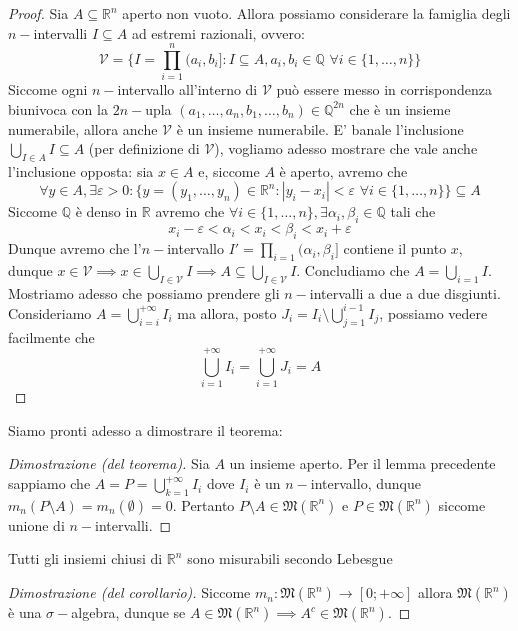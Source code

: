 \begin{proof}
	Sia $A \subseteq \mathbb{R}^n$ aperto non vuoto. Allora possiamo considerare la famiglia degli $n-$intervalli $I \subseteq A$ ad estremi razionali, ovvero:
	$$\mathcal{V} = \{I = \prod_{i=1}^n (a_i, b_i] : I \subseteq A, a_i, b_i \in \mathbb{Q} \, \, \forall i \in \{1, \ldots, n\} \}$$
	Siccome ogni $n-$intervallo all'interno di $\mathcal{V}$ può essere messo in corrispondenza biunivoca con la $2n-$upla $(a_1, \ldots, a_n, b_1, \ldots, b_n) \in \mathbb{Q}^{2n}$ che è un insieme numerabile, allora anche $\mathcal{V}$ è un insieme numerabile. E' banale l'inclusione $\bigcup\limits_{I \in A} I \subseteq A$ (per definizione di $\mathcal{V}$), vogliamo
	adesso mostrare che vale anche l'inclusione opposta: sia $x \in A$ e, siccome $A$ è aperto, avremo che 
	$$\forall y \in A, \exists \varepsilon > 0 : \{y = (y_1, \ldots, y_n) \in \mathbb{R}^n : |y_i - x_i| < \varepsilon \, \, \forall i \in \{1, \ldots, n \} \} \subseteq A$$
	Siccome $\mathbb{Q}$ è denso in $\mathbb{R}$ avremo che $\forall i \in \{1, \ldots, n \}, \exists \alpha_i, \beta_i \in \mathbb{Q}$ tali che
	$$
	x_i - \varepsilon < \alpha_i < x_i < \beta_i < x_i + \varepsilon 
	$$
	Dunque avremo che l'$n-$intervallo $I'=\prod\limits_{i=1} (\alpha_i, \beta_i]$ contiene il punto $x$, dunque $x \in \mathcal{V} \implies x \in \bigcup\limits_{I \in \mathcal{V}} I \implies A \subseteq \bigcup\limits_{I \in \mathcal{V}} I$. Concludiamo
	che $A = \bigcup\limits_{i=1} I$. \\
	Mostriamo adesso che possiamo prendere gli $n-$intervalli a due a due disgiunti. Consideriamo $A = \bigcup\limits_{i=i}^{+\infty} I_i$ ma allora, posto $J_i = I_i \setminus \bigcup\limits_{j=1}^{i-1} I_j$, possiamo vedere facilmente che
	$$
	\bigcup_{i=1}^{+\infty} I_i = \bigcup_{i=1}^{+\infty} J_i = A
	$$
\end{proof}
Siamo pronti adesso a dimostrare il teorema:
\begin{proof}[Dimostrazione (del teorema)]
	Sia $A$ un insieme aperto. Per il lemma precedente sappiamo che $A = P = \bigcup\limits_{k=1}^{+\infty} I_i$ dove $I_i$ è un $n-$intervallo, dunque $m_n(P \setminus A) = m_n(\emptyset) = 0$.
	Pertanto $P \setminus A \in \mathfrak{M}(\mathbb{R}^n)$ e $P \in \mathfrak{M}(\mathbb{R}^n)$ siccome unione di $n-$intervalli. 
\end{proof}
\begin{cor}
	Tutti gli insiemi chiusi di $\mathbb{R}^n$ sono misurabili secondo Lebesgue
\end{cor}
\begin{proof}[Dimostrazione (del corollario)]
	Siccome $m_n: \mathfrak{M}(\mathbb{R}^n) \to [0; +\infty]$ allora $\mathfrak{M}(\mathbb{R}^n)$ è una $\sigma-$algebra, dunque se $A \in \mathfrak{M}(\mathbb{R}^n) \implies A^c \in \mathfrak{M}(\mathbb{R}^n)$.
\end{proof}
